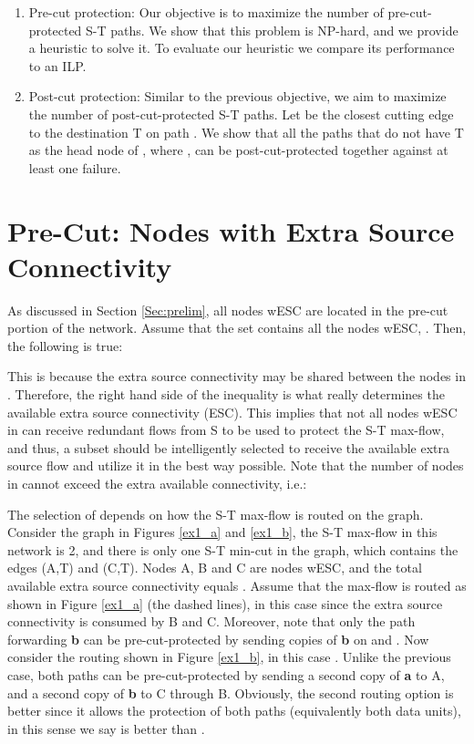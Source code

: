 \documentclass[conference]{IEEEtran}
\begin{document}
\begin{enumerate}
\item Pre-cut protection: Our objective is to maximize the number of pre-cut-protected S-T paths. We show that this problem is NP-hard, and we provide a heuristic to solve it. To evaluate our heuristic we compare its performance to an ILP.
\item Post-cut protection: Similar to the previous objective, we aim to maximize the number of post-cut-protected S-T paths. Let  be the closest cutting edge to the destination T on path . We show that all the paths that do not have T as the head node of  , where , can be post-cut-protected together against at least one failure. 
\end{enumerate}


















\section{Pre-Cut: Nodes with Extra Source Connectivity}
\label{Sec:preCut}

As discussed in Section \ref{Sec:prelim}, all nodes wESC are located in the pre-cut portion of the network. Assume that the set  contains all the nodes wESC, . Then, the following is true:



This is because the extra source connectivity may be shared between the nodes in . Therefore, the right hand side of the inequality is what really determines the available extra source connectivity (ESC). This implies that not all nodes wESC in  can receive redundant flows from S to be used to protect the S-T max-flow, and thus, a subset  should be intelligently selected to receive the available extra source flow and utilize it in the best way possible. Note that the number of nodes in  cannot exceed the extra available connectivity, i.e.:


The selection of  depends on how the S-T max-flow is routed on the graph. Consider the graph in Figures \ref{ex1_a} and \ref{ex1_b}, the S-T max-flow in this network is 2, and there is only one S-T min-cut in the graph, which contains the edges (A,T) and (C,T). Nodes A, B and C are nodes wESC, and the total available extra source connectivity equals . Assume that the max-flow is routed as shown in Figure \ref{ex1_a} (the dashed lines), in this case  since the extra source connectivity is consumed by B and C. Moreover, note that only the path forwarding \textbf{b} can be pre-cut-protected by sending copies of \textbf{b} on  and . Now consider the routing shown in Figure \ref{ex1_b}, in this case . Unlike the previous case, both paths can be pre-cut-protected by sending a second copy of \textbf{a} to A, and a second copy of \textbf{b} to C through B. Obviously, the second routing option is better since it allows the protection of both paths (equivalently both data units), in this sense we say  is better than . 
\end{document}
